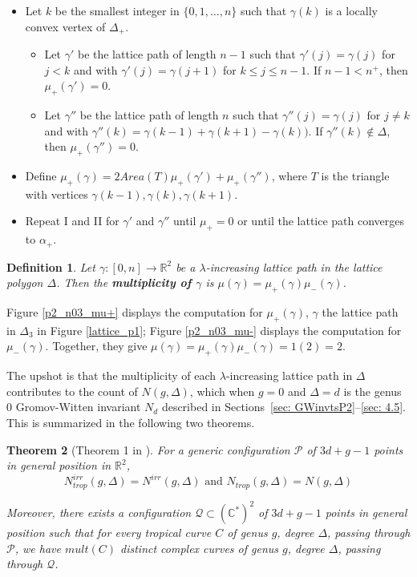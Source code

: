 \documentclass{amsart}
\newtheorem{theorem}{Theorem}[section]
\newtheorem{definition}[theorem]{Definition}
\begin{document}
 \begin{itemize}
     \item[I.] Let $k$ be the smallest integer in $\{0,1, \dots, n\}$ such that $\gamma(k)$ is a locally convex vertex of $\Delta_+$.
     \begin{itemize}
         \item[(i)] Let $\gamma'$ be the lattice path of length $n-1$ such that $\gamma'(j)=\gamma(j)$ for $j<k$ and with $\gamma'(j)=\gamma(j+1)$ for $k\leq j \leq n-1$. If $n-1<n^+$, then $\mu_+(\gamma')=0$.
         \item[(ii)] Let $\gamma''$ be the lattice path of length $n$ such that $\gamma''(j)=\gamma(j)$ for $j\neq k$ and with $\gamma''(k)=\gamma(k-1)+\gamma(k+1)-\gamma(k))$. If $\gamma''(k)\notin \Delta$, then $\mu_+(\gamma'')=0$.
     \end{itemize}
     \item[II.] Define $\mu_+(\gamma)=2Area(T)\mu_+(\gamma')+\mu_+(\gamma'')$, where $T$ is the triangle with vertices $\gamma(k-1), \gamma(k), \gamma(k+1)$.     \item[III.] Repeat I and II for $\gamma'$ and $\gamma''$ until $\mu_+=0$ or until the lattice path converges to $\alpha_+$.
 \end{itemize}

\begin{definition} Let $\gamma:[0,n]\rightarrow \mathbb{R}^2$ be a $\lambda$-increasing lattice path in the lattice polygon $\Delta$. Then the \textbf{multiplicity of $\gamma$} is $\mu(\gamma)=\mu_+(\gamma)\mu_-(\gamma)$.
\end{definition}
 Figure \ref{p2_n03_mu+} displays the computation for $\mu_+(\gamma)$, $\gamma$ the lattice path in $\Delta_3$ in Figure \ref{lattice_p1}; Figure \ref{p2_n03_mu-} displays the computation for $\mu_-(\gamma)$. Together, they give $\mu(\gamma)=\mu_+(\gamma)\mu_-(\gamma)=1(2)=2$.
 
 The upshot is that the multiplicity of each $\lambda$-increasing lattice path in $\Delta$ contributes to the count of $N(g, \Delta)$, which when $g=0$ and $\Delta=d$ is the genus 0 Gromov-Witten invariant $N_d$ described in Sections~\ref{sec: GWinvtsP2}--\ref{sec: 4.5}. %
 This is summarized in the following two theorems.

 \begin{theorem}[Theorem 1 in \cite{MikEnumTropGeom}] \label{thm: 7.2} For a generic configuration $\mathcal{P}$ of $3d+g-1$ points in general position in $\mathbb{R}^2$, 
 $$N^{irr}_{trop}(g, \Delta)=N^{irr}(g,\Delta) \text{ and } N_{trop}(g, \Delta)= N(g, \Delta)$$

 Moreover, there exists a configuration $\mathcal{Q}\subset (\mathbb{C}^*)^2$ of $3d+g-1$ points in general position such that for every tropical curve $C$ of genus $g$, degree $\Delta$, passing through $\mathcal{P}$, we have $mult(C)$ distinct complex curves of genus $g$, degree $\Delta$, passing through $\mathcal{Q}$.
     
 \end{theorem}
\end{document}
